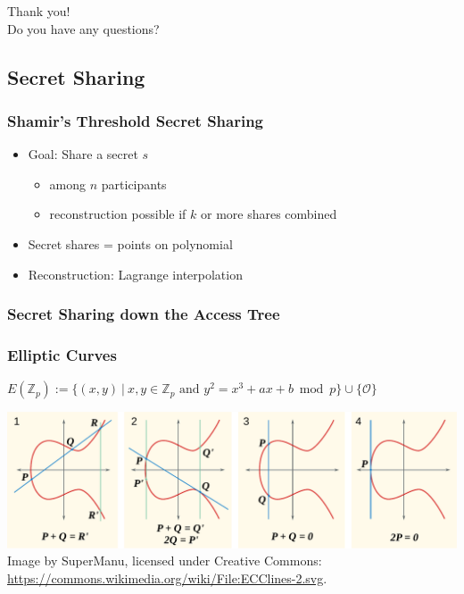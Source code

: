 \PraesentationMasterWeissBlau
\begin{frame}[c]
    \begin{center}
        \Huge Thank you!\\

        \vfill
        \Large Do you have any questions?
    \end{center}
\end{frame}

\PraesentationMasterStandard

\subsection{Secret Sharing}
\begin{frame}[c]
    \frametitle{Shamir's Threshold Secret Sharing}
    \begin{minipage}{.5\textwidth}
        \begin{itemize}
            \item<1-> Goal: Share a secret $s$
            \begin{itemize}
                \item among $n$ participants
                \item reconstruction possible if $k$ or more shares combined
            \end{itemize}
            \item<2-> Secret shares = points on polynomial
            \item<3-> Reconstruction: Lagrange interpolation
        \end{itemize}
    \end{minipage}
    \begin{minipage}{.48\textwidth}
        
    \end{minipage}
\end{frame}

\begin{frame}
    \frametitle{Secret Sharing down the Access Tree}
    
\end{frame}

\begin{frame}[c]
    \frametitle{Elliptic Curves}
    \begin{center}
        \Large
        $E(\mathbb{Z}_p) := \{(x, y)~|~x,y \in \mathbb{Z}_p \text{ and } y^2 = x^3 + a x + b \bmod{p}\} \cup \{\mathcal{O}\}$
    \end{center}
    \includegraphics[width=\textwidth]{../thesis/figures/ecc_point_addition.pdf}
    Image by SuperManu, licensed under Creative Commons: \url{https://commons.wikimedia.org/wiki/File:ECClines-2.svg}.
\end{frame}

